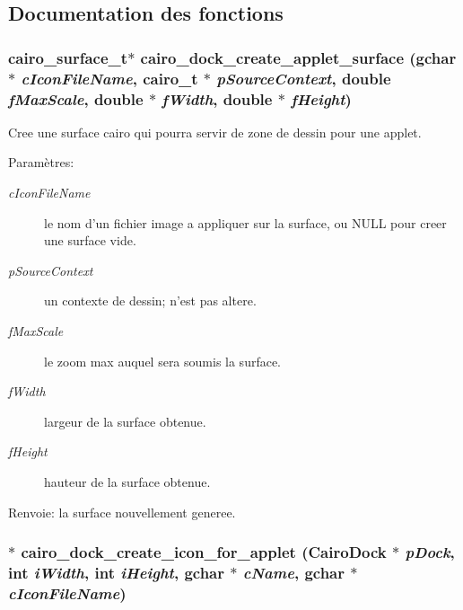 \subsection{Documentation des fonctions}
\subsubsection{\setlength{\rightskip}{0pt plus 5cm}cairo\_\-surface\_\-t$\ast$ cairo\_\-dock\_\-create\_\-applet\_\-surface (gchar $\ast$ {\em c\-Icon\-File\-Name}, cairo\_\-t $\ast$ {\em p\-Source\-Context}, double {\em f\-Max\-Scale}, double $\ast$ {\em f\-Width}, double $\ast$ {\em f\-Height})}\label{cairo-dock-applet-factory_8c_e6f070123dab179309fda57b26c19f08}


Cree une surface cairo qui pourra servir de zone de dessin pour une applet. \begin{Desc}
\item[Param\`{e}tres:]
\begin{description}
\item[{\em c\-Icon\-File\-Name}]le nom d'un fichier image a appliquer sur la surface, ou NULL pour creer une surface vide. \item[{\em p\-Source\-Context}]un contexte de dessin; n'est pas altere. \item[{\em f\-Max\-Scale}]le zoom max auquel sera soumis la surface. \item[{\em f\-Width}]largeur de la surface obtenue. \item[{\em f\-Height}]hauteur de la surface obtenue. \end{description}
\end{Desc}
\begin{Desc}
\item[Renvoie:]la surface nouvellement generee. \end{Desc}
\subsubsection{$\ast$ cairo\_\-dock\_\-create\_\-icon\_\-for\_\-applet ({\bf Cairo\-Dock} $\ast$ {\em p\-Dock}, int {\em i\-Width}, int {\em i\-Height}, gchar $\ast$ {\em c\-Name}, gchar $\ast$ {\em c\-Icon\-File\-Name})}\label{cairo-dock-applet-factory_8c_f4d7d3330b8bb296422c34b51db7094c}


